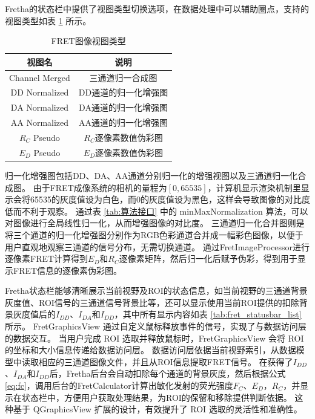 Fretha的状态栏中提供了视图类型切换选项，在数据处理中可以辅助圈点，支持的视图类型如表 \ref{tab:fretha_viewtype_list} 所示。
\begin{table}[htbp]
  \centering
  \caption[FRET图像视图类型]{FRET图像视图类型}
  \label{tab:fretha_viewtype_list}
    \begin{tabular}{cc}
      \toprule[1.5pt]
      {视图名} & {说明} \\
      \midrule
      Channel Merged & 三通道归一合成图 \\
      DD Normalized & DD通道的归一化增强图 \\
      DA Normalized & DA通道的归一化增强图 \\
      AA Normalized & AA通道的归一化增强图 \\
      $R_C$ Pseudo & $R_C$逐像素数值伪彩图 \\
      $E_D$ Pseudo & $E_D$逐像素数值伪彩图 \\
      \bottomrule[1.5pt]
    \end{tabular}
\end{table}
归一化增强图包括DD、DA、AA通道分别归一化的增强视图以及三通道归一化合成图。
由于FRET成像系统的相机的量程为$[0,65535]$，计算机显示渲染机制里显示会将65535的灰度值设为白色，而0的灰度值设为黑色，这样会导致图像的对比度低而不利于观察。
通过表 \ref{tab:算法接口} 中的 minMaxNormalization 算法，可以对图像进行全局线性归一化，从而增强图像的对比度。
三通道归一化合并图则是将三个通道的归一化增强图分别作为RGB色彩通道合并成一幅彩色图像，以便于用户直观地观察三通道的信号分布，无需切换通道。
通过FretImageProcessor进行逐像素FRET计算得到$E_D$和$R_C$逐像素矩阵，然后归一化后赋予伪彩，得到用于显示FRET信息的逐像素伪彩图。

Fretha状态栏能够清晰展示当前视野及ROI的状态信息，如当前视野的三通道背景灰度值、ROI信号的三通道信号背景比等，还可以显示使用当前ROI提供的扣除背景灰度值后的$I_{DD}$、$I_{DA}$和$I_{DD}$，其中所有显示内容如表 \ref{tab:fret_statusbar_list} 所示。
FretGraphicsView 通过自定义鼠标释放事件的信号，实现了与数据访问层的数据交互。
当用户完成 ROI 选取并释放鼠标时，FretGraphicsView 会将 ROI 的坐标和大小信息传递给数据访问层。
数据访问层依据当前视野索引，从数据模型中读取相应的三通道图像文件，并且从ROI信息提取FRET信号。
在获得了$I_{DD}$、$I_{DA}$和$I_{DD}$后，Fretha后台会自动扣除每个通道的背景灰度，然后根据公式 \ref{eq:fc}，调用后台的FretCalculator计算出敏化发射的荧光强度$F_C$、$E_D$，$R_C$，并显示在状态栏中，方便用户获取处理结果，为ROI的保留和移除提供判断依据。
这种基于 QGraphicsView 扩展的设计，有效提升了 ROI 选取的灵活性和准确性。 

